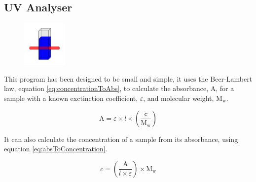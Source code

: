 \documentclass[a4paper]{article}
\begin{document}
	\pagestyle{fancy}
	\renewcommand{\headrulewidth}{0pt}
	\renewcommand{\footrulewidth}{0.4pt}
	\renewcommand{\subsectionmark}[1]{}
	\renewcommand{\sectionmark}[1]{\markboth{#1}{}}
	\rfoot{\thepage}
	\doublespacing

	\begin{centering}
 		\section*{UV Analyser}
 		\label{sec:uv_analyser}
	\end{centering} 	

		\begin{figure}[ht!]
			\centering
			\includegraphics[height=6em]{Graphics/UVIcon}
		\end{figure}

		\noindent This program has been designed to be small and simple, it uses the Beer-Lambert law, equation \ref{eq:concentrationToAbs}, to calculate the absorbance, A, for a sample with a known exctinction coefficient, $\varepsilon$, and molecular weight, M$_{\text{w}}$.

		\begin{equation}
			\text{A} = \varepsilon \times l \times \left( \frac{c}{\text{M}_{\text{w}}} \right)
			\label{eq:concentrationToAbs}
		\end{equation}

		\noindent It can also calculate the concentration of a sample from its absorbance, using equation \ref{eq:absToConcentration}.

		\begin{equation}
			c = \left( \frac{\text{A}}{l \times \varepsilon} \right) \times \text{M}_{\text{w}}
			\label{eq:absToConcentration}
		\end{equation}
\end{document}
